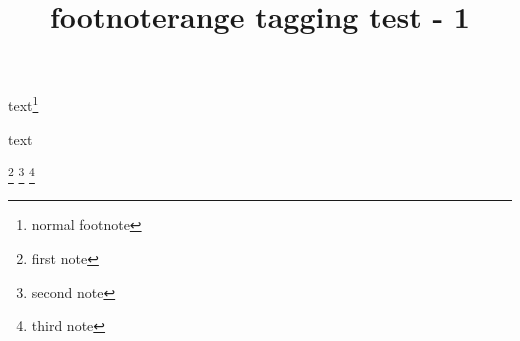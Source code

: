 \documentclass{article}
\title{footnoterange tagging test - 1}
\begin{document}
text\footnote{normal footnote}

text
\begin{footnoterange}
\footnote{first note}%
\footnote{second note}%
\footnote{third note}%
\end{footnoterange}
\end{document}

